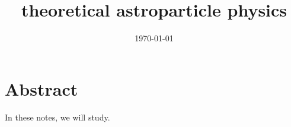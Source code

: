\documentclass[a4paper, 12pt]{memoir}
\title{theoretical astroparticle physics}
\date{\today}
\begin{document}
\frontmatter



\tableofcontents

\mainmatter



\chapter*{Abstract}

    In these notes, we will study.
    



\backmatter


\clearpage
{}
\printbibliography
\end{document}
